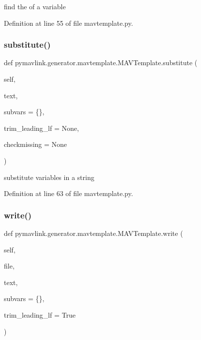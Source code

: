 \begin{DoxyVerb}find the of a variable\end{DoxyVerb}
 

Definition at line 55 of file mavtemplate.\+py.

\mbox{\label{classpymavlink_1_1generator_1_1mavtemplate_1_1MAVTemplate_adf6f114f842c14ecb4f8b41a0eeba60c}} 
\subsubsection{\texorpdfstring{substitute()}{substitute()}}
{\footnotesize\ttfamily def pymavlink.\+generator.\+mavtemplate.\+M\+A\+V\+Template.\+substitute (\begin{DoxyParamCaption}\item[{}]{self,  }\item[{}]{text,  }\item[{}]{subvars = {\ttfamily \{\}},  }\item[{}]{trim\+\_\+leading\+\_\+lf = {\ttfamily None},  }\item[{}]{checkmissing = {\ttfamily None} }\end{DoxyParamCaption})}

\begin{DoxyVerb}substitute variables in a string\end{DoxyVerb}
 

Definition at line 63 of file mavtemplate.\+py.

\mbox{\label{classpymavlink_1_1generator_1_1mavtemplate_1_1MAVTemplate_a8d8b9f9e281c877cad428f3a28ae61d0}} 
\subsubsection{\texorpdfstring{write()}{write()}}
{\footnotesize\ttfamily def pymavlink.\+generator.\+mavtemplate.\+M\+A\+V\+Template.\+write (\begin{DoxyParamCaption}\item[{}]{self,  }\item[{}]{file,  }\item[{}]{text,  }\item[{}]{subvars = {\ttfamily \{\}},  }\item[{}]{trim\+\_\+leading\+\_\+lf = {\ttfamily True} }\end{DoxyParamCaption})}

